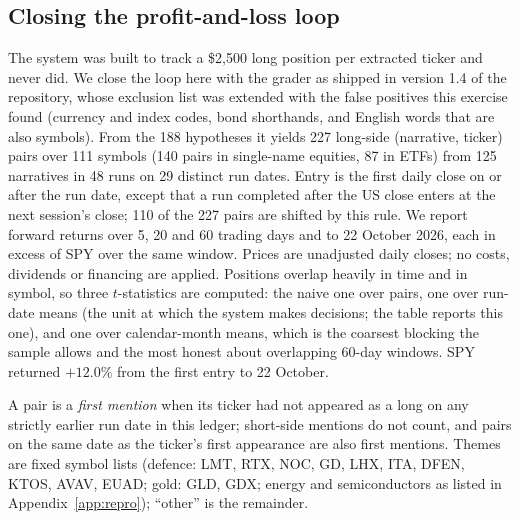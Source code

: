 \documentclass[11pt]{article}
\begin{document}
\subsection{Closing the profit-and-loss loop}\label{sec:ledger}
The system was built to track a \$2,500 long position per extracted ticker and never did. We close the loop here with the grader as shipped in version 1.4 of the repository, whose exclusion list was extended with the false positives this exercise found (currency and index codes, bond shorthands, and English words that are also symbols). From the 188 hypotheses it yields 227 long-side (narrative, ticker) pairs over 111 symbols (140 pairs in single-name equities, 87 in ETFs) from 125 narratives in 48 runs on 29 distinct run dates. Entry is the first daily close on or after the run date, except that a run completed after the US close enters at the next session's close; 110 of the 227 pairs are shifted by this rule. We report forward returns over 5, 20 and 60 trading days and to 22 October 2026, each in excess of SPY over the same window. Prices are unadjusted daily closes; no costs, dividends or financing are applied. Positions overlap heavily in time and in symbol, so three $t$-statistics are computed: the naive one over pairs, one over run-date means (the unit at which the system makes decisions; the table reports this one), and one over calendar-month means, which is the coarsest blocking the sample allows and the most honest about overlapping 60-day windows. SPY returned $+12.0\%$ from the first entry to 22 October.

A pair is a \emph{first mention} when its ticker had not appeared as a long on any strictly earlier run date in this ledger; short-side mentions do not count, and pairs on the same date as the ticker's first appearance are also first mentions. Themes are fixed symbol lists (defence: LMT, RTX, NOC, GD, LHX, ITA, DFEN, KTOS, AVAV, EUAD; gold: GLD, GDX; energy and semiconductors as listed in Appendix~\ref{app:repro}); ``other'' is the remainder.
\end{document}
